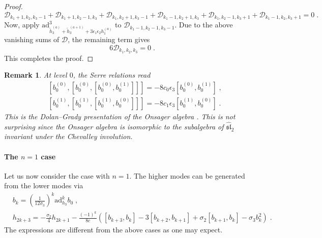 \documentclass[11pt]{article}
\numberwithin{equation}{section}
\numberwithin{figure}{section}
\numberwithin{table}{section}
\newtheorem{remark}{Remark}
\begin{document}
\begin{proof}
	\begin{equation}
		\mathcal{D}_{k_1+1,k_2,k_3-1}+\mathcal{D}_{k_1+1,k_2-1,k_3}+\mathcal{D}_{k_1,k_2+1,k_3-1}+\mathcal{D}_{k_1-1,k_2+1,k_3}+\mathcal{D}_{k_1,k_2-1,k_3+1}+\mathcal{D}_{k_1-1,k_2,k_3+1}=0\;.
	\end{equation}
	Now, apply $\mathrm{ad}_{\widetilde{h}^{(a)}_3+\widetilde{h}^{(a+1)}_3+3\epsilon_1\epsilon_2h^{(a)}_1}^3$ to $\mathcal{D}_{k_1-1,k_2-1,k_3-1}$. Due to the above vanishing sums of $\mathcal{D}$, the remaining term gives
	\begin{equation}
		6\mathcal{D}_{k_1,k_2,k_3}=0\;.
	\end{equation}
	This completes the proof.
\end{proof}

\begin{remark}
	At level $0$, the Serre relations read
	\begin{subequations}
		\begin{align}
			&\left[b^{(0)}_0,\left[b^{(0)}_0,\left[b^{(0)}_0,b^{(1)}_0\right]\right]\right]=-8c_0\epsilon_3\left[b^{(0)}_0,b^{(1)}_0\right]\;,\\
			&\left[b^{(1)}_0,\left[b^{(1)}_0,\left[b^{(1)}_0,b^{(0)}_0\right]\right]\right]=-8c_1\epsilon_3\left[b^{(1)}_0,b^{(0)}_0\right]\;.
		\end{align}
	\end{subequations}
	This is the Dolan--Grady presentation of the Onsager algebra \cite{dolan1982conserved}. This is not surprising since the Onsager algebra is isomorphic to the subalgebra of $\widehat{\mathfrak{sl}}_2$ invariant under the Chevalley involution.
\end{remark}

\paragraph{The \texorpdfstring{$n=1$}{n=1} case} Let us now consider the case with $n=1$. The higher modes can be generated from the lower modes via
\begin{subequations}
	\begin{align}
		&b_k=\left(\frac{1}{12\sigma_3}\right)^k\mathrm{ad}_{h_3}^kb_0\;,\label{higherbn1}\\
		&h_{2k+3}=-\frac{\sigma_2}{4}h_{2k+1}-\frac{(-1)^k}{8c}\left([b_{k+3},b_k]-3[b_{k+2},b_{k+1}]+\sigma_2[b_{k+1},b_k]-\sigma_3b_k^2\right)\label{higherhn1}\;.
	\end{align}
\end{subequations}
The expressions are different from the above cases as one may expect.
\end{document}
